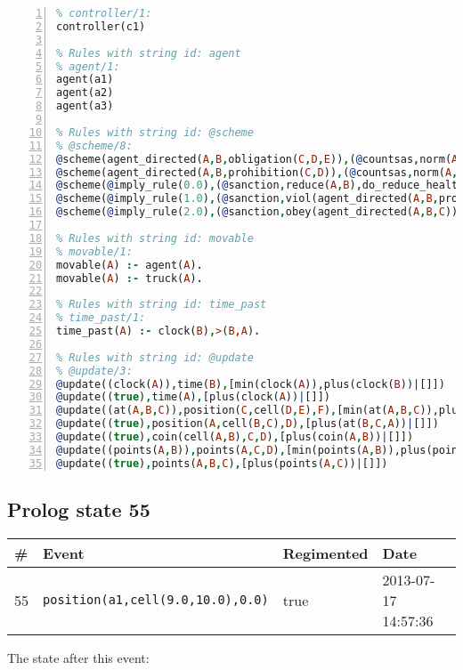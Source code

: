 \documentclass[11pt]{article}\usepackage[utf8]{inputenc}\usepackage{geometry}
\begin{document}
\begin{lstlisting}[language=Prolog, numbers=left]
% Rules with string id: controller
% controller/1:
controller(c1)

% Rules with string id: agent
% agent/1:
agent(a1)
agent(a2)
agent(a3)

% Rules with string id: @scheme
% @scheme/8:
@scheme(agent_directed(A,B,obligation(C,D,E)),(@countsas,norm(A,B,F,obligation(C,D,E)),F),false,(listTrue(C)),(time_past(D)),false,[plus(viol(agent_directed(A,B,obligation(C,D,E))))|[]],[plus(obey(agent_directed(A,B,obligation(C,D,E))))|[]])
@scheme(agent_directed(A,B,prohibition(C,D)),(@countsas,norm(A,B,E,prohibition(C,D)),E),(listTrue(C)),false,(false),false,[plus(viol(agent_directed(A,B,prohibition(C,D))))|[]],[plus(obey(agent_directed(A,B,prohibition(C,D))))|[]])
@scheme(@imply_rule(0.0),(@sanction,reduce(A,B),do_reduce_health(A,B),notifyAgent(A,changed(status))),true,false,false,false,[min(reduce(A,B))|[]],[])
@scheme(@imply_rule(1.0),(@sanction,viol(agent_directed(A,B,prohibition(C,D))),do_sanction(D)),true,false,false,false,[min(viol(agent_directed(A,B,prohibition(C,D))))|[]],[])
@scheme(@imply_rule(2.0),(@sanction,obey(agent_directed(A,B,C))),true,false,false,false,[min(obey(agent_directed(A,B,C)))|[]],[])

% Rules with string id: movable
% movable/1:
movable(A) :- agent(A).
movable(A) :- truck(A).

% Rules with string id: time_past
% time_past/1:
time_past(A) :- clock(B),>(B,A).

% Rules with string id: @update
% @update/3:
@update((clock(A)),time(B),[min(clock(A)),plus(clock(B))|[]])
@update((true),time(A),[plus(clock(A))|[]])
@update((at(A,B,C)),position(C,cell(D,E),F),[min(at(A,B,C)),plus(at(D,E,C))|[]])
@update((true),position(A,cell(B,C),D),[plus(at(B,C,A))|[]])
@update((true),coin(cell(A,B),C,D),[plus(coin(A,B))|[]])
@update((points(A,B)),points(A,C,D),[min(points(A,B)),plus(points(A,D))|[]])
@update((true),points(A,B,C),[plus(points(A,C))|[]])

\end{lstlisting}
\clearpage 
\subsection{Prolog state 55}
\begin{table}[ht]
\centering 
\begin{tabular}{l l l l} 
\textbf{\#} & \textbf{Event} & \textbf{Regimented} & \textbf{Date} \\ [0.5ex] 
\hline
55&\texttt{position(a1,cell(9.0,10.0),0.0)}&true&2013-07-17 14:57:36\\ [1ex] \hline\end{tabular}
\end{table}
The state after this event:
\end{document}

